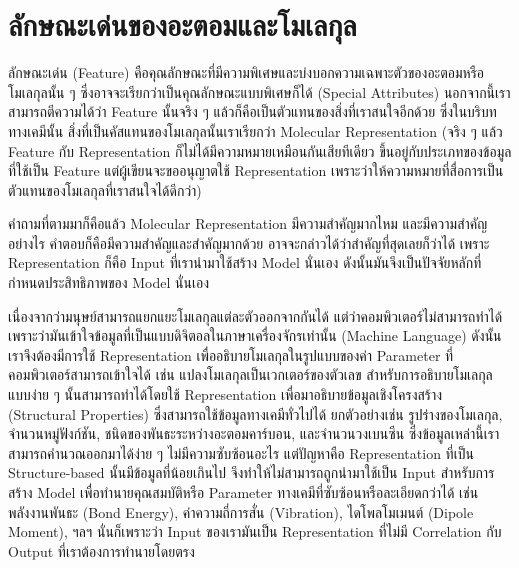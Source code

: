 

\chapter{ลักษณะเด่นของอะตอมและโมเลกุล}
\label{ch:feature}

ลักษณะเด่น (Feature) คือคุณลักษณะที่มีความพิเศษและบ่งบอกความเฉพาะตัวของอะตอมหรือโมเลกุลนั้น ๆ ซึ่งอาจจะเรียกว่าเป็นคุณลักษณะแบบพิเศษก็ได้ 
(Special Attributes) นอกจากนี้เราสามารถตีความได้ว่า Feature นั้นจริง ๆ แล้วก็คือเป็นตัวแทนของสิ่งที่เราสนใจอีกด้วย ซึ่งในบริบททางเคมีนั้น
สิ่งที่เป็นคัสแทนของโมเลกุลนั้นเราเรียกว่า Molecular Representation (จริง ๆ แล้ว Feature กับ Representation ก็ไม่ได้มีความหมายเหมือนกันเสียทีเดียว
ขึ้นอยู่กับประเภทของข้อมูลที่ใช้เป็น Feature แต่ผู้เขียนจะขออนุญาตใช้ Representation เพราะว่าให้ความหมายที่สื่อการเป็นตัวแทนของโมเลกุลที่เราสนใจได้ดีกว่า)\cite{stepisnik2021}

คำถามที่ตามมาก็คือแล้ว Molecular Representation มีความสำคัญมากไหม และมีความสำคัญอย่างไร คำตอบก็คือมีความสำคัญและสำคัญมากด้วย 
อาจจะกล่าวได้ว่าสำคัญที่สุดเลยก็ว่าได้ เพราะ Representation ก็คือ Input ที่เรานำมาใช้สร้าง Model นั่นเอง ดังนั้นมันจึงเป็นปัจจัยหลักที่กำหนดประสิทธิภาพของ Model นั่นเอง 

เนื่องจากว่ามนุษย์สามารถแยกแยะโมเลกุลแต่ละตัวออกจากกันได้ แต่ว่าคอมพิวเตอร์ไม่สามารถทำได้ เพราะว่ามันเข้าใจข้อมูลที่เป็นแบบดิจิตอลในภาษาเครื่องจักรเท่านั้น 
(Machine Language) ดังนั้นเราจึงต้องมีการใช้ Representation เพื่ออธิบายโมเลกุลในรูปแบบของค่า Parameter ที่คอมพิวเตอร์สามารถเข้าใจได้ 
เช่น แปลงโมเลกุลเป็นเวกเตอร์ของตัวเลข สำหรับการอธิบายโมเลกุลแบบง่าย ๆ นั้นสามารถทำได้โดยใช้ Representation เพื่อมาอธิบายข้อมูลเชิงโครงสร้าง 
(Structural Properties) ซึ่งสามารถใช้ข้อมูลทางเคมีทั่วไปได้ ยกตัวอย่างเช่น รูปร่างของโมเลกุล, จำนวนหมู่ฟังก์ชัน, ชนิดของพันธะระหว่างอะตอมคาร์บอน, 
และจำนวนวงเบนซีน ซึ่งข้อมูลเหล่านี้เราสามารถคำนวณออกมาได้ง่าย ๆ ไม่มีความซับซ้อนอะไร แต่ปัญหาคือ Representation ที่เป็น Structure-based 
นั้นมีข้อมูลที่น้อยเกินไป จึงทำให้ไม่สามารถถูกนำมาใช้เป็น Input สำหรับการสร้าง Model เพื่อทำนายคุณสมบัติหรือ Parameter ทางเคมีที่ซับซ้อนหรือละเอียดกว่าได้ 
เช่น พลังงานพันธะ (Bond Energy), ค่าความถี่การสั่น (Vibration), ไดโพลโมเมนต์ (Dipole Moment), ฯลฯ นั่นก็เพราะว่า Input ของเรามันเป็น 
Representation ที่ไม่มี Correlation กับ Output ที่เราต้องการทำนายโดยตรง

